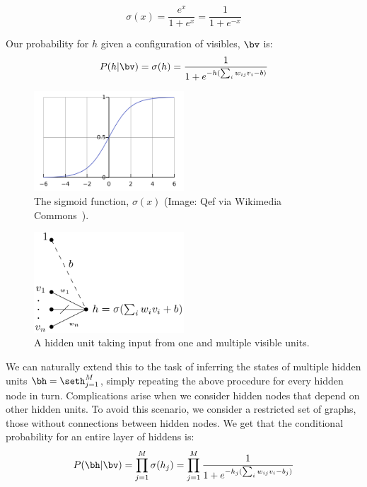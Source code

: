 \begin{equation}%
  \sigma(x)=\frac{e^x}{1+e^x}=\frac{1}{1+e^{-x}}
\end{equation}%

Our probability for $h$ given a configuration of visibles, $\bv$ is:
\begin{equation}%
  P(h|\bv)=\sigma(h)=\frac{1}{1+e^{-h(\sum_i w_{ij} v_i - b )}}
\end{equation}%

\begin{figure}[ht]
  \centering
  \includegraphics[width=0.5\textwidth]{figures/sigmoid.png}
  \caption{The sigmoid function, $\sigma(x)$ (Image: Qef via Wikimedia Commons~\cite{sigmoid}).\label{fig:sigmoid.png} }
\end{figure}

\begin{figure}[ht]
  \centering
  \includegraphics[width=0.5\textwidth]{figures/perceptron.png}
  \caption{A hidden unit taking input from one and multiple visible
    units.\label{fig:perceptron} }
\end{figure}

We can naturally extend this to the task of inferring the states of
multiple hidden units $\bh=\seth_{j=1}^M$, simply repeating the above
procedure for every hidden node in turn. Complications arise when we
consider hidden nodes that depend on other hidden units. To avoid this
scenario, we consider a restricted set of graphs, those without
connections between hidden nodes. We get that the conditional
probability for an entire layer of hiddens is:%
\begin{equation}%
  P(\bh|\bv)=\prod_{j=1}^M \sigma(h_j)=\prod_{j=1}^M \frac{1}{1+e^{-h_j(\sum_i w_{ij} v_i - b_j )}}
\end{equation}%

